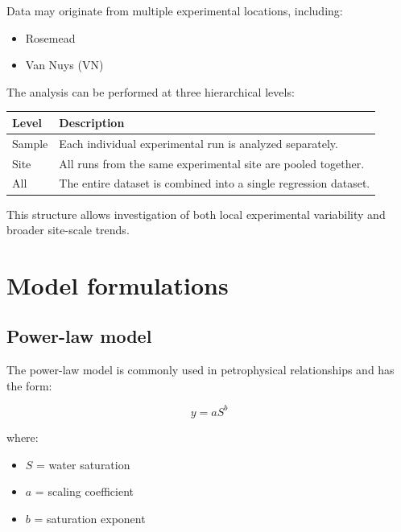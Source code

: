 \documentclass[11pt]{article}
\begin{document}
Data may originate from multiple experimental locations, including:

\begin{itemize}[leftmargin=1.5em]

\item Rosemead

\item Van Nuys (VN)

\end{itemize}

The analysis can be performed at three hierarchical levels:

\begin{longtable}{p{} p{}}
\toprule
\textbf{Level} & \textbf{Description}\\
\midrule
\endhead
Sample & Each individual experimental run is analyzed separately.\\
Site & All runs from the same experimental site are pooled together.\\
All & The entire dataset is combined into a single regression dataset.\\
\bottomrule
\end{longtable}

This structure allows investigation of both local experimental variability and broader site-scale trends.

\section{Model formulations}

\subsection{Power-law model}

The power-law model is commonly used in petrophysical relationships and has the form:

\[
y = a S^{b}
\]

where:

\begin{itemize}

\item $S$ = water saturation

\item $a$ = scaling coefficient

\item $b$ = saturation exponent

\end{itemize}
\end{document}
